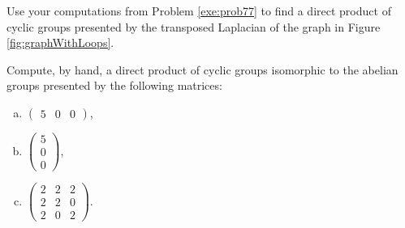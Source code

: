 \documentclass[../algebraNotesMSRI-UP2016.tex]{subfiles}
\begin{document}
\begin{frame}[c]{}{}
\begin{exe}[cf. Problem 80]\label{exe:prob80}
Use your computations from Problem \ref{exe:prob77} to find a direct product of cyclic groups presented by the transposed Laplacian of the graph in Figure \ref{fig:graphWithLoops}.%
\end{exe}
\end{frame}

\begin{frame}{}{}
\begin{exe}[cf. Problem 81]\label{exe:prob81}
Compute, by hand, a direct product %
of cyclic groups isomorphic to the abelian groups presented by the following matrices:

\begin{enumerate}[(a)]%
\item $\begin{pmatrix}
	5 & 0 & 0 
	\end{pmatrix}$,
\item $\begin{pmatrix}
	5 \\
	0 \\
	0
	\end{pmatrix}$,
\item $\begin{pmatrix}
	2 & 2 & 2 \\
	2 & 2 & 0 \\
	2 & 0 & 2
	\end{pmatrix}$.
\end{enumerate}	
\end{exe}
\end{frame}
\end{document}
